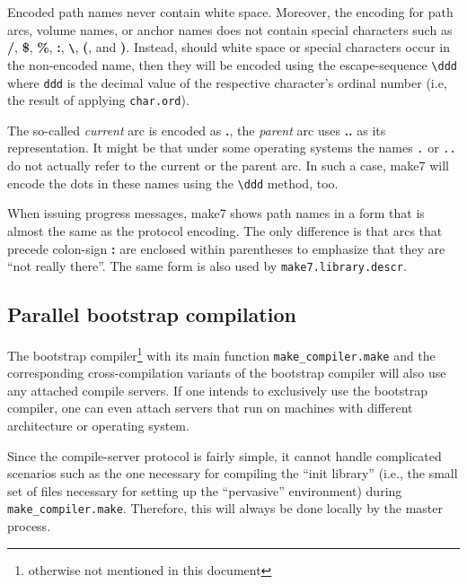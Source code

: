 Encoded path names never contain white space.  Moreover, the encoding
for path arcs, volume names, or anchor names does not contain special
characters such as {\bf /}, {\bf \$}, {\bf \%}, {\bf :}, {\bf
\verb|\|}, {\bf (}, and {\bf )}.  Instead, should white space or
special characters occur in the non-encoded name, then they will be
encoded using the escape-sequence \verb|\ddd| where {\tt ddd} is the
decimal value of the respective character's ordinal number (i.e, the
result of applying {\tt char.ord}).

The so-called {\em current} arc is encoded as {\bf .}, the {\em
parent} arc uses {\bf ..} as its representation.  It might be that
under some operating systems the names {\tt .} or {\tt ..} do not
actually refer to the current or the parent arc.  In such a case, make7
will encode the dots in these names using the \verb|\ddd| method, too.

When issuing progress messages, make7 shows path names in a form that is
almost the same as the protocol encoding.  The only difference is that
arcs that precede colon-sign {\bf :} are enclosed within parentheses
to emphasize that they are ``not really there''.  The same form is
also used by {\tt make7.library.descr}.

\subsection{Parallel bootstrap compilation}

The bootstrap compiler\footnote{otherwise not mentioned in this
document} with its main function {\tt make_compiler.make} and the corresponding
cross-compilation variants of the bootstrap compiler will also use any
attached compile servers.  If one intends to exclusively use the
bootstrap compiler, one can even attach servers that run on machines
with different architecture or operating system.

Since the compile-server protocol is fairly simple, it cannot handle
complicated scenarios such as the one necessary for compiling the
``init library'' (i.e., the small set of files necessary for setting up
the ``pervasive'' environment) during {\tt make_compiler.make}.  Therefore, this
will always be done locally by the master process.
